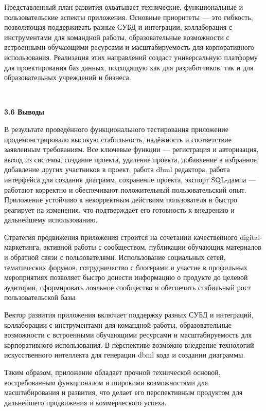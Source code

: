 Представленный план развития охватывает технические, функциональные и пользовательские аспекты приложения. Основные приоритеты — это гибкость, позволяющая поддерживать разные СУБД и интеграции, коллаборация с инструментами для командной работы, образовательные возможности с встроенными обучающими ресурсами и масштабируемость для корпоративного использования. Реализация этих направлений создаст универсальную платформу для проектирования баз данных, подходящую как для разработчиков, так и для образовательных учреждений и бизнеса.

\

\textbf{\large 3.6 Выводы}

В результате проведённого функционального тестирования приложение
продемонстрировало высокую стабильность, надёжность и соответствие
заявленным требованиям. Все ключевые функции — регистрация
и авторизация, выход из системы, создание проекта, удаление проекта, добавление в избранное, добавление других участников в проект, работа dbml редактора, работа интерфейса для создания диаграмм, сохранение проекта, экспорт SQL-дампа — работают корректно и
обеспечивают положительный пользовательский опыт. Приложение
устойчиво к некорректным действиям пользователя и быстро реагирует на
изменения, что подтверждает его готовность к внедрению и дальнейшему использованию.

Стратегия продвижения приложения строится на сочетании
качественного digital-маркетинга, активной работы с сообществом,
публикации обучающих материалов и обратной связи с пользователями.
Использование социальных сетей, тематических форумов, сотрудничество с
блогерами и участие в профильных мероприятиях позволяет быстро донести
информацию о продукте до целевой аудитории, сформировать лояльное
сообщество и обеспечить стабильный рост пользовательской базы.

Вектор развития приложения включает поддержку разных СУБД и интеграций, коллаборации с инструментами для командной работы, образовательные возможности с встроенными обучающими ресурсами и масштабируемость для корпоративного использования. В перспективе возможно внедрение
технологий искусственного интеллекта для генерации dbml кода и создании диаграммы.

Таким образом, приложение обладает прочной технической основой,
востребованным функционалом и широкими возможностями для
масштабирования и развития, что делает его перспективным продуктом для
дальнейшего продвижения и коммерческого успеха.